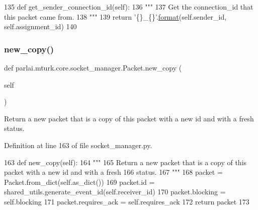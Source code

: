 \begin{DoxyCode}
135     \textcolor{keyword}{def }get\_sender\_connection\_id(self):
136         \textcolor{stringliteral}{"""}
137 \textcolor{stringliteral}{        Get the connection\_id that this packet came from.}
138 \textcolor{stringliteral}{        """}
139         \textcolor{keywordflow}{return} \textcolor{stringliteral}{'\{\}\_\{\}'}.\hyperlink{namespaceparlai_1_1chat__service_1_1services_1_1messenger_1_1shared__utils_a32e2e2022b824fbaf80c747160b52a76}{format}(self.sender\_id, self.assignment\_id)
140 
\end{DoxyCode}
\mbox{\label{classparlai_1_1mturk_1_1core_1_1socket__manager_1_1Packet_a308912fbfb5d9423d882100db5c79756}} 
\subsubsection{\texorpdfstring{new\+\_\+copy()}{new\_copy()}}
{\footnotesize\ttfamily def parlai.\+mturk.\+core.\+socket\+\_\+manager.\+Packet.\+new\+\_\+copy (\begin{DoxyParamCaption}\item[{}]{self }\end{DoxyParamCaption})}

\begin{DoxyVerb}Return a new packet that is a copy of this packet with a new id and with a fresh
status.
\end{DoxyVerb}
 

Definition at line 163 of file socket\+\_\+manager.\+py.


\begin{DoxyCode}
163     \textcolor{keyword}{def }new\_copy(self):
164         \textcolor{stringliteral}{"""}
165 \textcolor{stringliteral}{        Return a new packet that is a copy of this packet with a new id and with a fresh}
166 \textcolor{stringliteral}{        status.}
167 \textcolor{stringliteral}{        """}
168         packet = Packet.from\_dict(self.as\_dict())
169         packet.id = shared\_utils.generate\_event\_id(self.receiver\_id)
170         packet.blocking = self.blocking
171         packet.requires\_ack = self.requires\_ack
172         \textcolor{keywordflow}{return} packet
173 
\end{DoxyCode}
\mbox{\label{classparlai_1_1mturk_1_1core_1_1socket__manager_1_1Packet_a739506a92dd4482116b64e2e2d4671f2}} 
